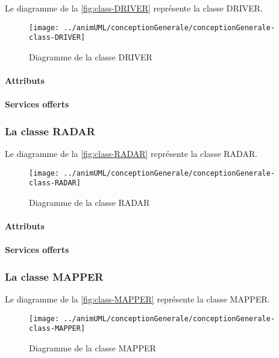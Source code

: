 Le diagramme de la \autoref{fig:class-DRIVER} représente la classe DRIVER.
\begin{figure}[H]
	\centering
	\texttt{[image: ../animUML/conceptionGenerale/conceptionGenerale-class-DRIVER]}
	\caption{Diagramme de la classe DRIVER}
	\label{fig:class-DRIVER}
\end{figure}


\paragraph{Attributs}
\classDRIVERProperties
\paragraph{Services offerts}
\classDRIVEROperations
\subsubsection{La classe RADAR}

Le diagramme de la \autoref{fig:class-RADAR} représente la classe RADAR.
\begin{figure}[H]
	\centering
	\texttt{[image: ../animUML/conceptionGenerale/conceptionGenerale-class-RADAR]}
	\caption{Diagramme de la classe RADAR}
	\label{fig:class-RADAR}
\end{figure}


\paragraph{Attributs}
\classRADARProperties
\paragraph{Services offerts}
\classRADAROperations
\subsubsection{La classe MAPPER}

Le diagramme de la \autoref{fig:class-MAPPER} représente la classe MAPPER.
\begin{figure}[H]
	\centering
	\texttt{[image: ../animUML/conceptionGenerale/conceptionGenerale-class-MAPPER]}
	\caption{Diagramme de la classe MAPPER}
	\label{fig:class-MAPPER}
\end{figure}


